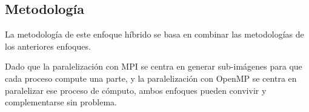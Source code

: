 \subsection{Metodología}

La metodología de este enfoque híbrido se basa en combinar las metodologías de los anteriores enfoques.

Dado que la paralelización con MPI se centra en generar sub-imágenes para que cada proceso compute una parte, y la paralelización con OpenMP se centra en paralelizar ese proceso de cómputo, ambos enfoques pueden convivir y complementarse sin problema.